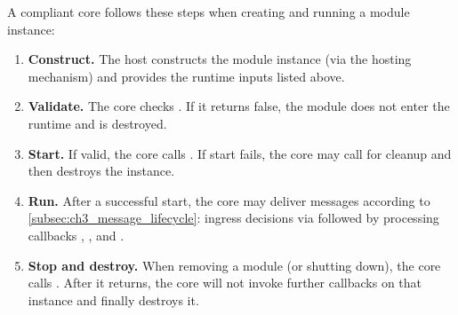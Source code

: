 A compliant core follows these steps when creating and running a module instance:
\begin{enumerate}
    \item \textbf{Construct.} The host constructs the module instance (via the hosting mechanism) and provides the runtime inputs listed above.
    \item \textbf{Validate.} The core checks . If it returns false, the module does not enter the runtime and is destroyed.
    \item \textbf{Start.} If valid, the core calls . If start fails, the core may call  for cleanup and then destroys the instance.
    \item \textbf{Run.} After a successful start, the core may deliver messages according to \autoref{subsec:ch3_message_lifecycle}: ingress decisions via  followed by processing callbacks , , and .
    \item \textbf{Stop and destroy.} When removing a module (or shutting down), the core calls . After it returns, the core will not invoke further callbacks on that instance and finally destroys it.
\end{enumerate}

